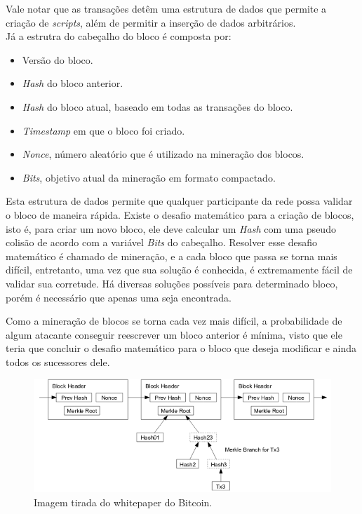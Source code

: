 \documentclass{ufsctex/ufsctex}
\begin{document}
Vale notar que as transações detêm uma estrutura de dados que permite a criação
de \textit{scripts}, além de permitir a inserção de dados arbitrários. \\

Já a estrutra do cabeçalho do bloco é composta por:
\begin{itemize}
	\item Versão do bloco.
	\item \textit{Hash} do bloco anterior.
	\item \textit{Hash} do bloco atual, baseado em todas as transações do bloco.
	\item \textit{Timestamp} em que o bloco foi criado.
	\item \textit{Nonce}, número aleatório que é utilizado na mineração dos blocos.
	\item \textit{Bits}, objetivo atual da mineração em formato compactado.
\end{itemize}

Esta estrutura de dados permite que qualquer participante da rede possa validar o
bloco de maneira rápida. Existe o desafio matemático para a criação de blocos, isto é,
para criar um novo bloco, ele deve calcular um \textit{Hash} com uma pseudo colisão de acordo
com a variável \textit{Bits} do cabeçalho. Resolver esse desafio matemático é chamado
de mineração, e a cada bloco que passa se torna mais difícil, entretanto, uma vez
que sua solução é conhecida, é extremamente fácil de validar sua corretude. Há diversas
soluções possíveis para determinado bloco, porém é necessário que apenas uma seja
encontrada.\cite{Antonopoulos}

Como a mineração de blocos se torna cada vez mais difícil, a probabilidade de algum
atacante conseguir reescrever um bloco anterior é mínima, visto que ele teria que concluir
o desafio matemático para o bloco que deseja modificar e ainda todos os sucessores dele.

\begin{figure}[h]
	\centering
	\includegraphics[scale=0.4]{blockchain}
	\caption{Imagem tirada do whitepaper do Bitcoin.}
	\label{fig:blockchain}
\end{figure}
\end{document}
